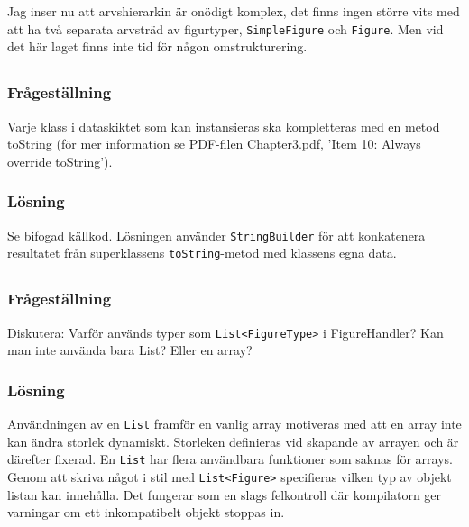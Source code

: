 Jag inser nu att arvshierarkin är onödigt komplex, det finns ingen större vits
med att ha två separata arvsträd av figurtyper, \texttt{SimpleFigure} och
\texttt{Figure}. Men vid det här laget finns inte tid för någon
omstrukturering.


\subsection{}\label{sec:uppg2b}
\subsubsection*{Frågeställning}
Varje klass i dataskiktet som kan instansieras ska kompletteras med en metod
toString (för mer information se PDF-filen Chapter3.pdf, ’Item 10: Always
override toString’).

\subsubsection*{Lösning}
Se bifogad källkod. Lösningen använder \texttt{StringBuilder} för att
konkatenera resultatet från superklassens \texttt{toString}-metod med klassens
egna data.


\subsection{}\label{sec:uppg2c}
\subsubsection*{Frågeställning}
Diskutera: Varför används typer som \texttt{List<FigureType>} i FigureHandler?
Kan man inte använda bara List? Eller en array?


\subsubsection*{Lösning}
Användningen av en \texttt{List} framför en vanlig array motiveras med att en
array inte kan ändra storlek dynamiskt. Storleken definieras vid skapande av
arrayen och är därefter fixerad. En \texttt{List} har flera användbara
funktioner som saknas för arrays. Genom att skriva något i stil med
\texttt{List<Figure>} specifieras vilken typ av objekt listan kan innehålla.
Det fungerar som en slags felkontroll där kompilatorn ger varningar om ett
inkompatibelt objekt stoppas in.


